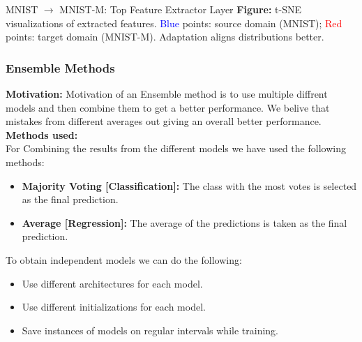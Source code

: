 \documentclass{beamer}
\begin{document}
\begin{frame}{\centering \large MNIST $\rightarrow$ MNIST-M: Top Feature Extractor Layer}
\vspace{0.3cm}
\small
\textbf{Figure:} t-SNE visualizations of extracted features. \textcolor{blue}{Blue} points: source domain (MNIST); \textcolor{red}{Red} points: target domain (MNIST-M). Adaptation aligns distributions better.

\end{frame}

\begin{frame}
    \frametitle{Ensemble Methods}

    \textbf{Motivation:} Motivation of an Ensemble method is to use multiple diffrent models and then combine them to get a better performance. 
    We belive that mistakes from different averages out giving an overall better performance. \\

    \textbf{Methods used:} \\
    For Combining the results from the different models we have used the following methods: 
    \begin{itemize}
        \item \textbf{Majority Voting [Classification]:} The class with the most votes is selected as the final prediction.
        \item \textbf{Average [Regression]:} The average of the predictions is taken as the final prediction.
    \end{itemize}
    To obtain independent models we can do the following:
    \begin{itemize}
        \item Use different architectures for each model.
        \item Use different initializations for each model.
        \item Save instances of models on regular intervals while training.
    \end{itemize}

    

\end{frame}
\end{document}
